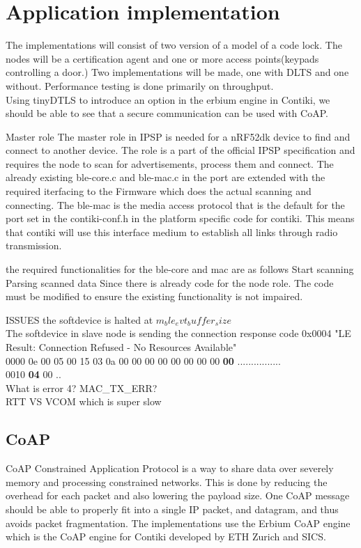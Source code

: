 \documentclass{article}
\begin{document}
\section{Application implementation}
The implementations will consist of two version of a model of a code lock. The nodes will be a certification agent and one or more access points(keypads controlling a door.) Two implementations will be made, one with DLTS and one without.
Performance testing is done primarily on throughput.\\

Using tinyDTLS \cite{tinydtls} to introduce an option in the erbium engine in Contiki, we should be able to see that a secure communication can be used with CoAP.


Master role
The master role in IPSP is needed for a nRF52dk device to find and connect to another device. The role is a part of the official IPSP specification and requires the node to scan for advertisements, process them and connect. The already existing ble-core.c and ble-mac.c in the port are extended with the required iterfacing to the Firmware which does the actual scanning and connecting. The ble-mac is the media access protocol that is the default for the port set in the contiki-conf.h in the platform specific code for contiki. This means that contiki will use this interface medium to establish all links through radio transmission.

the required functionalities for the ble-core and mac are as follows
Start scanning
Parsing scanned data
Since there is already code for the node role. The code must be modified to ensure the existing functionality is not impaired.


ISSUES
the softdevice is halted at $m_ble_evt_buffer_size$\\
The softdevice in slave node is sending the connection response code 0x0004 "LE Result: Connection Refused - No Resources Available"\\
0000   0e 00 05 00 15 03 0a 00 00 00 00 00 00 00 00 \textbf{00}  ................\\
0010  \textbf{04} 00                                             ..\\
What is error 4? MAC_TX_ERR?\\
RTT VS VCOM which is super slow\\



\subsection{CoAP}
CoAP Constrained Application Protocol is a way to share data over severely memory and processing constrained networks. This is done by reducing the overhead for each packet and also lowering the payload size. One CoAP message should be able to properly fit into a single IP packet, and datagram, and thus avoids packet fragmentation. \cite{coap}
The implementations use the Erbium CoAP engine which is the CoAP engine for Contiki developed by ETH Zurich and SICS.
\end{document}
